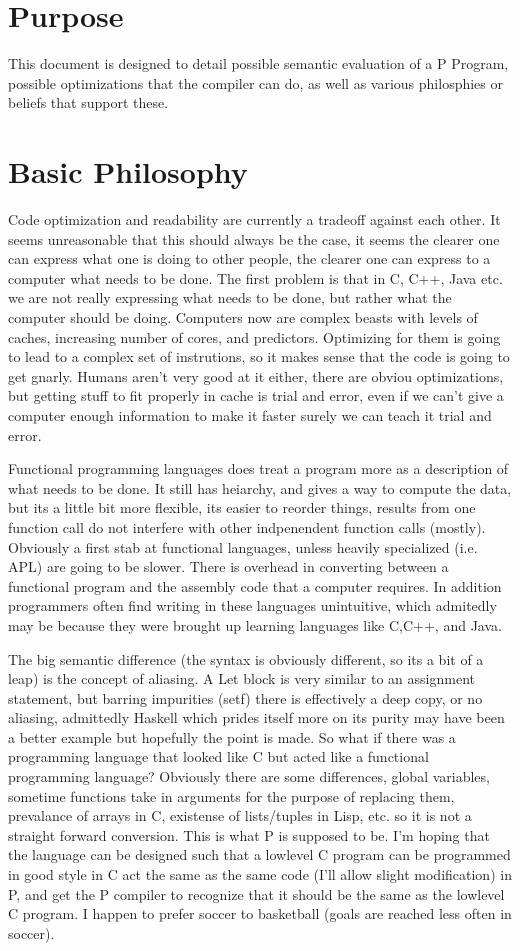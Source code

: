 \section{Purpose}
This document is designed to detail possible semantic evaluation of a P Program, possible optimizations that the compiler can do, as well as various philosphies or 
beliefs that support these.
\section{Basic Philosophy}
Code optimization and readability are currently a tradeoff against each other. It seems unreasonable that this should always be the case, it seems the clearer one can 
express what one is doing to other people, the clearer one can express to a computer what needs to be done. The first problem is that in C, C++, Java etc. we are not 
really expressing what needs to be done, but rather what the computer should be doing. Computers now are complex beasts with levels of caches, increasing number of cores, 
and predictors. Optimizing for them is going to lead to a complex set of instrutions, so it makes sense that the code is going to get gnarly. Humans aren't very good at 
it either, there are obviou optimizations, but getting stuff to fit properly in cache is trial and error, even if we can't give a computer enough information to make it 
faster surely we can teach it trial and error.

Functional programming languages does treat a program more as a description of what needs to be done. It still has heiarchy, and gives a way to compute the data, but its 
a little bit more flexible, its easier to reorder things, results from one function call do not interfere with other indpenendent function calls (mostly). Obviously a 
first stab at functional languages, unless heavily specialized (i.e. APL) are going to be slower. There is overhead in converting between a functional program and the 
assembly code that a computer requires. In addition programmers often find writing in these languages unintuitive, which admitedly may be because they were brought up 
learning languages like C,C++, and Java.

The big semantic difference (the syntax is obviously different, so its a bit of a leap) is the concept of aliasing. A Let block is very similar to an assignment 
statement, but barring impurities (setf) there is effectively a deep copy, or no aliasing, admittedly Haskell which prides itself more on its purity may have been a 
better example but hopefully the point is made. So what if there was a programming language that looked like C but acted like a functional programming language? Obviously 
there are some differences, global variables, sometime functions take in arguments for the purpose of replacing them, prevalance of arrays in C, existense of lists/tuples 
in Lisp, etc. so it is not a straight forward conversion. This is what P is supposed to be. I'm hoping that the language can be designed such that a lowlevel C program 
can be programmed in good style in C act the same as the same code (I'll allow slight modification) in P, and get the P compiler to recognize that it should be the same 
as the lowlevel C program. I happen to prefer soccer to basketball (goals are reached less often in soccer).
